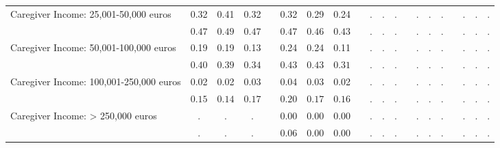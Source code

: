 \begin{center}
{\begin{longtable}{L{6cm} c c c p{.5cm} c c c p{.5cm} c c c p{.5cm} c c c p{.5cm} c c c}
 \quad Caregiver Income: 25,001-50,000 euros & 0.32 &      0.41 &      0.32 & &      0.32 &      0.29 &      0.24 & &         . &         . &         . & &         . &         . &         . & &         . &         . &         . \\*
 \quad & $\mathit{     0.47}$ & $\mathit{     0.49}$ & $\mathit{     0.47}$ & & $\mathit{     0.47}$ & $\mathit{     0.46}$ & $\mathit{     0.43}$ & & $\mathit{        .}$ & $\mathit{        .}$ & $\mathit{        .}$ & & $\mathit{        .}$ & $\mathit{        .}$ & $\mathit{        .}$ & & $\mathit{        .}$ & $\mathit{        .}$ & $\mathit{        .}$ \\[.2em]
 \quad Caregiver Income: 50,001-100,000 euros & 0.19 &      0.19 &      0.13 & &      0.24 &      0.24 &      0.11 & &         . &         . &         . & &         . &         . &         . & &         . &         . &         . \\*
 \quad & $\mathit{     0.40}$ & $\mathit{     0.39}$ & $\mathit{     0.34}$ & & $\mathit{     0.43}$ & $\mathit{     0.43}$ & $\mathit{     0.31}$ & & $\mathit{        .}$ & $\mathit{        .}$ & $\mathit{        .}$ & & $\mathit{        .}$ & $\mathit{        .}$ & $\mathit{        .}$ & & $\mathit{        .}$ & $\mathit{        .}$ & $\mathit{        .}$ \\[.2em]
 \quad Caregiver Income: 100,001-250,000 euros & 0.02 &      0.02 &      0.03 & &      0.04 &      0.03 &      0.02 & &         . &         . &         . & &         . &         . &         . & &         . &         . &         . \\*
 \quad & $\mathit{     0.15}$ & $\mathit{     0.14}$ & $\mathit{     0.17}$ & & $\mathit{     0.20}$ & $\mathit{     0.17}$ & $\mathit{     0.16}$ & & $\mathit{        .}$ & $\mathit{        .}$ & $\mathit{        .}$ & & $\mathit{        .}$ & $\mathit{        .}$ & $\mathit{        .}$ & & $\mathit{        .}$ & $\mathit{        .}$ & $\mathit{        .}$ \\[.2em]
 \quad Caregiver Income: > 250,000 euros & . &         . &         . & &      0.00 &      0.00 &      0.00 & &         . &         . &         . & &         . &         . &         . & &         . &         . &         . \\*
 \quad & $\mathit{        .}$ & $\mathit{        .}$ & $\mathit{        .}$ & & $\mathit{     0.06}$ & $\mathit{     0.00}$ & $\mathit{     0.00}$ & & $\mathit{        .}$ & $\mathit{        .}$ & $\mathit{        .}$ & & $\mathit{        .}$ & $\mathit{        .}$ & $\mathit{        .}$ & & $\mathit{        .}$ & $\mathit{        .}$ & $\mathit{        .}$ \\[.2em]

\end{longtable}}
\end{center}

